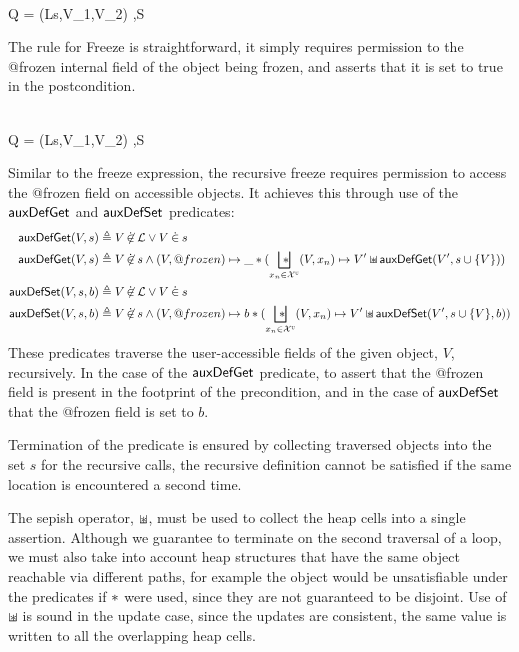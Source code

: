 \documentclass[a4paper,notitlepage]{report}
\begin{document}
    {
       \\
      Q = \getValue(Ls,V_1,V_2) \sep S
    }
    {}

    The rule for Freeze is straightforward, it simply requires permission to the
    @frozen internal field of the object being frozen, and asserts that it is
    set to true in the postcondition.

    {
       \\
      Q = \getValue(Ls,V_1,V_2) \sep S
    }
    {}

  Similar to the freeze expression, the recursive freeze requires permission to
  access the @frozen field on accessible objects. It achieves this through use
  of the $\mathsf{auxDefGet}$ and $\mathsf{auxDefSet}$ predicates:
  \begin{align*}
    \auxDefGet(V,s) & \triangleq V \notdotin \loc \lor V \dotin s \\
    \auxDefGet(V,s) & \triangleq V \notdotin s \land (V, @frozen) \pointsto \_
      \sep (\bigsepish_{x_n \in \uvars} (V,x_n) \pointsto V' \sepish
      \auxDefGet(V', s\cup\{V\})) \\
    \auxDefSet(V,s,b) & \triangleq V \notdotin \loc \lor V \dotin s \\
    \auxDefSet(V,s,b) & \triangleq V \notdotin s \land (V, @frozen) \pointsto b
      \sep (\bigsepish_{x_n \in \uvars} (V,x_n) \pointsto V' \sepish
      \auxDefSet(V', s\cup\{V\}, b))
  \end{align*}
  These predicates traverse the user-accessible fields of the given object, $V$,
  recursively. In the case of the $\mathsf{auxDefGet}$ predicate, to assert that the
  @frozen field is present in the footprint of the precondition, and in the case
  of $\mathsf{auxDefSet}$ that the @frozen field is set to $b$.

  Termination of the predicate is ensured by collecting traversed objects into
  the set $s$ for the recursive calls, the recursive definition cannot be
  satisfied if the same location is encountered a second time.

  The sepish operator, $\mathbin{\sqcup\mkern-10mu*}$, must be used to collect the heap cells into a
  single assertion. Although we guarantee to terminate on the second traversal
  of a loop, we must also take into account heap structures that have the same
  object reachable via different paths, for example the object 
  would be unsatisfiable under the predicates if $\mathbin{*}$ were used, since they
  are not guaranteed to be disjoint. Use of
  $\mathbin{\sqcup\mkern-10mu*}$ is sound in the update case, since the updates are consistent, the
  same value is written to all the overlapping heap cells.
\end{document}
